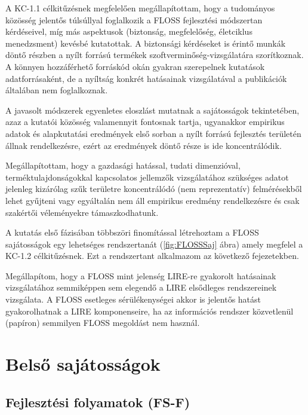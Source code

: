 \documentclass[12pt,magyar,a4paper,oneside]{scrreprt}
\begin{document}
A KC-1.1 célkitűzésnek megfelelően megállapítottam, hogy a tudományos
közösség jelentős túlsúllyal foglalkozik a FLOSS fejlesztési módszertan
kérdéseivel, míg más aspektusok (biztonság, megfelelőség, életciklus
menedzsment) kevésbé kutatottak. A biztonsági kérdéseket is érintő
munkák döntő részben a nyílt forrású termékek
szoftverminőség-vizsgálatára szorítkoznak. A könnyen hozzáférhető
forráskód okán gyakran szerepelnek kutatások adatforrásaként, de a
nyíltság konkrét hatásainak vizsgálatával a publikációk általában nem
foglalkoznak.

A javasolt módszerek egyenletes eloszlást mutatnak a sajátosságok
tekintetében, azaz a kutatói közösség valamennyit fontosnak tartja,
ugyanakkor empirikus adatok és alapkutatási eredmények első sorban a
nyílt forrású fejlesztés területén állnak rendelkezésre, ezért az
eredmények döntő része is ide koncentrálódik.

Megállapítottam, hogy a gazdasági hatással, tudati dimenzióval,
terméktulajdonságokkal kapcsolatos jellemzők vizsgálatához szükséges
adatot jelenleg kizárólag szűk területre koncentrálódó (nem
reprezentatív) felmérésekből lehet gyűjteni vagy egyáltalán nem áll
empirikus eredmény rendelkezésre és csak szakértői véleményekre
támaszkodhatunk.

A kutatás első fázisában többszöri finomítással létrehoztam a FLOSS
sajátosságok egy lehetséges rendszertanát (\ref{fig:FLOSSSaj} ábra)
amely megfelel a KC-1.2 célkitűzésnek. Ezt a rendszertant alkalmazom az
következő fejezetekben.

Megállapítom, hogy a FLOSS mint jelenség LIRE-re gyakorolt hatásainak
vizsgálatához semmiképpen sem elegendő a LIRE elsődleges rendszereinek
vizsgálata. A FLOSS esetleges sérülékenységei akkor is jelentős hatást
gyakorolhatnak a LIRE komponenseire, ha az információs rendszer
közvetlenül (papíron) semmilyen FLOSS megoldást nem használ.

\hypertarget{sec:FLOSSBELSO}{%
\chapter{Belső sajátosságok}\label{sec:FLOSSBELSO}}

\hypertarget{fejlesztuxe9si-folyamatok-fs-f}{%
\section{Fejlesztési folyamatok
(FS-F)}\label{fejlesztuxe9si-folyamatok-fs-f}}
\end{document}
